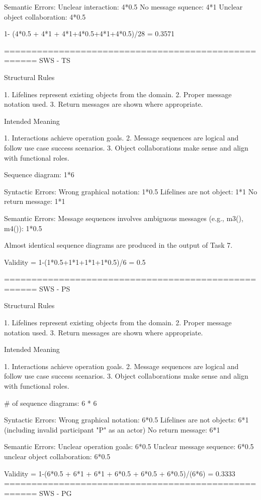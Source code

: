 Semantic Errors:	
Unclear interaction: 4*0.5
No message squence: 4*1
Unclear object collaboration: 4*0.5

1- (4*0.5 + 4*1 + 4*1+4*0.5+4*1+4*0.5)/28 =  0.3571

====================================================
SWS - TS

Structural Rules

1. Lifelines represent existing objects from the domain.
2. Proper message notation used.
3. Return messages are shown where appropriate.

Intended Meaning

1. Interactions achieve operation goals.
2. Message sequences are logical and follow use case success scenarios.
3. Object collaborations make sense and align with functional roles.

Sequence diagram: 1*6 

Syntactic Errors:
Wrong graphical notation: 1*0.5
Lifelines are not object: 1*1
No return message: 1*1

Semantic Errors: 
Message sequences involves ambiguous messages (e.g., m3(), m4()): 1*0.5

Almost identical sequence diagrams are produced in the output of Task 7. 

Validity = 1-(1*0.5+1*1+1*1+1*0.5)/6 = 0.5
 
====================================================
SWS - PS

Structural Rules

1. Lifelines represent existing objects from the domain.
2. Proper message notation used.
3. Return messages are shown where appropriate.

Intended Meaning

1. Interactions achieve operation goals.
2. Message sequences are logical and follow use case success scenarios.
3. Object collaborations make sense and align with functional roles.

# of sequence diagrams: 6 * 6

Syntactic Errors:
Wrong graphical notation: 6*0.5
Lifelines are not objects: 6*1 (including invalid participant "P" as an actor)
No return message: 6*1

Semantic Errors:
Unclear operation goals: 6*0.5
Unclear message sequence: 6*0.5 
unclear object collaboration: 6*0.5

Validity = 1-(6*0.5 + 6*1 + 6*1 + 6*0.5 + 6*0.5 + 6*0.5)/(6*6) = 0.3333
====================================================
SWS - PG

